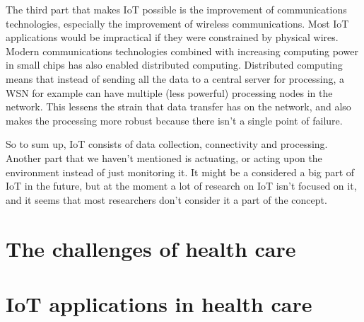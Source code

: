 The third part that makes IoT possible is the improvement of communications
technologies, especially the improvement of wireless communications. Most IoT
applications would be impractical if they were constrained by physical wires.
Modern communications technologies combined with increasing computing power in
small chips has also enabled distributed computing.  Distributed computing
means that instead of sending all the data to a central server for processing,
a WSN for example can have multiple (less powerful) processing nodes in the
network. This lessens the strain that data transfer has on the network, and
also makes the processing more robust because there isn't a single point of
failure.~\cite{Yu2006}

So to sum up, IoT consists of data collection, connectivity and processing.
Another part that we haven't mentioned is actuating, or acting upon the
environment instead of just monitoring it. It might be a considered a big part
of IoT in the future, but at the moment a lot of research on IoT isn't focused
on it, and it seems that most researchers don't consider it a part of the
concept.

\section{The challenges of health care}
\label{sec:health}

\section{IoT applications in health care}
\label{sec:iot-health}
